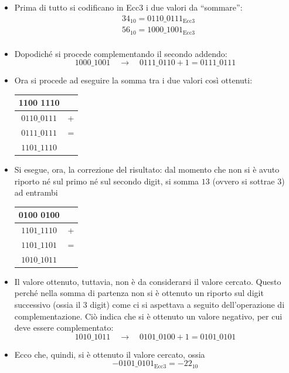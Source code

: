 \documentclass[a4paper]{extarticle}
\newcommand{\quotes}[1]{``#1''}
\renewcommand\arraystretch{}
\begin{document}
\begin{itemize}
    \item Prima di tutto si codificano in Ecc3 i due valori da \quotes{sommare}:
    \begin{align*}
        &34_{10} = 0110\_0111_{\text{Ecc3}}\\
        &56_{10} = 1000\_1001_{\text{Ecc3}}\\
    \end{align*}

    \item Dopodiché si procede complementando il secondo addendo:
    \[1000\_1001 \hspace{1em} \rightarrow \hspace{1em} 0111\_0110 + 1 = 0111\_0111\]

    \item Ora si procede ad eseguire la somma tra i due valori così ottenuti:
    \noindent
    \begin{table}[H]
    \setlength{\tabcolsep}{4pt}
    \renewcommand{\arraystretch}{1}
    \centering
    \begin{tabular}{cc}
        1100 1110 &\\
        \hline
        $0110\_0111$ & +\\
        $0111\_0111$ & =\\
        \hline
        $1101\_1110$
    \end{tabular}
    \end{table}

    \item Si esegue, ora, la correzione del risultato: dal momento che non si è avuto riporto né sul primo né sul secondo digit, si somma $13$ (ovvero si sottrae $3$) ad entrambi
    
    \noindent
    \begin{table}[H]
    \setlength{\tabcolsep}{4pt}
    \renewcommand{\arraystretch}{1}
    \centering
    \begin{tabular}{cc}
        0100 0100 &\\
        \hline
        $1101\_1110$ & +\\
        $1101\_1101$ & =\\
        \hline
        $1010\_1011$
    \end{tabular}
    \end{table}

    \item Il valore ottenuto, tuttavia, non è da considerarsi il valore cercato. Questo perché nella somma di partenza non si è ottenuto un riporto sul digit successivo (ossia il $3$ digit) come ci si aspettava a seguito dell'operazione di complementazione. Ciò indica che si è ottenuto un valore negativo, per cui deve essere complementato:
    \[1010\_1011 \hspace{1em} \rightarrow \hspace{1em} 0101\_0100 + 1 = 0101\_0101\]

    \item Ecco che, quindi, si è ottenuto il valore cercato, ossia
    \[- 0101\_0101_{\text{Ecc}3} = -22_{10}\]
\end{itemize}
\end{document}
